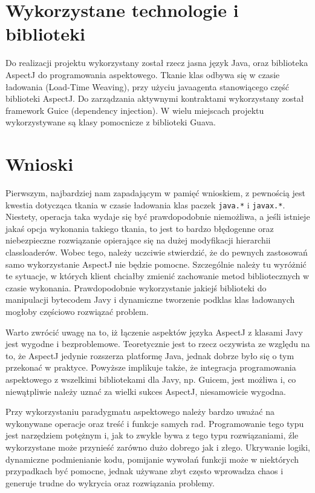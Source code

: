 \documentclass[12pt,a4paper,titlepage]{article}
\begin{document}
\section{Wykorzystane technologie i biblioteki}
Do realizacji projektu wykorzystany został rzecz jasna język Java, oraz biblioteka AspectJ do programowania aspektowego. Tkanie klas odbywa się w czasie ładowania (Load-Time Weaving), przy użyciu javaagenta stanowiącego część biblioteki AspectJ. Do zarządzania aktywnymi kontraktami wykorzystany został framework Guice (dependency injection). W wielu miejscach projektu wykorzystywane są klasy pomocnicze z biblioteki Guava.

\section{Wnioski}
Pierwszym, najbardziej nam zapadającym w pamięć wnioskiem, z pewnością jest kwestia dotycząca tkania w czasie ładowania klas paczek \texttt{java.*} i \texttt{javax.*}. Niestety, operacja taka wydaje się być prawdopodobnie niemożliwa, a jeśli istnieje jakaś opcja wykonania takiego tkania, to jest to bardzo błędogenne oraz niebezpieczne rozwiązanie opierające się na dużej modyfikacji hierarchii classloaderów. Wobec tego, należy uczciwie stwierdzić, że do pewnych zastosowań samo wykorzystanie AspectJ nie będzie pomocne. Szczególnie należy tu wyróżnić te sytuacje, w których klient chciałby zmienić zachowanie metod bibliotecznych w czasie wykonania. Prawdopodobnie wykorzystanie jakiejś biblioteki do manipulacji bytecodem Javy i dynamiczne tworzenie podklas klas ładowanych mogłoby częściowo rozwiązać problem.

Warto zwrócić uwagę na to, iż łączenie aspektów języka AspectJ z klasami Javy jest wygodne i bezproblemowe. Teoretycznie jest to rzecz oczywista ze względu na to, że AspectJ jedynie rozszerza platformę Java, jednak dobrze było się o tym przekonać w praktyce. Powyższe implikuje także, że integracja programowania aspektowego z wszelkimi bibliotekami dla Javy, np. Guicem, jest możliwa i, co niewątpliwie należy uznać za wielki sukces AspectJ, niesamowicie wygodna.

Przy wykorzystaniu paradygmatu aspektowego należy bardzo uważać na wykonywane operacje oraz treść i funkcje samych rad. Programowanie tego typu jest narzędziem potężnym i, jak to zwykle bywa z tego typu rozwiązaniami, źle wykorzystane może przynieść zarówno dużo dobrego jak i złego. Ukrywanie logiki, dynamiczne podmienianie kodu, pomijanie wywołań funkcji może w niektórych przypadkach być pomocne, jednak używane zbyt często wprowadza chaos i generuje trudne do wykrycia oraz rozwiązania problemy.
\end{document}
